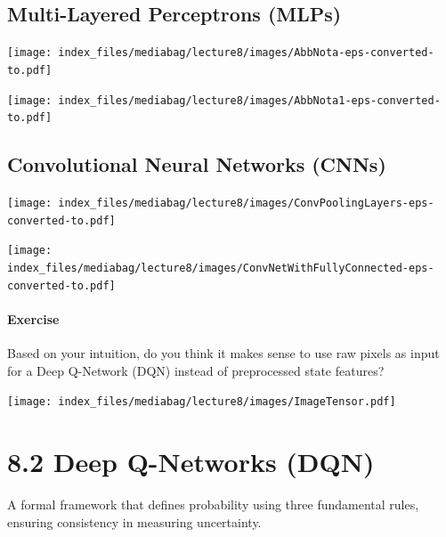 \documentclass[
  letterpaper,
  DIV=11,
  numbers=noendperiod]{scrreprt}
\begin{document}
\section{Multi-Layered Perceptrons
(MLPs)}\label{multi-layered-perceptrons-mlps}

\texttt{[image: index\_files/mediabag/lecture8/images/AbbNota-eps-converted-to.pdf]}

\texttt{[image: index\_files/mediabag/lecture8/images/AbbNota1-eps-converted-to.pdf]}

\section{Convolutional Neural Networks
(CNNs)}\label{convolutional-neural-networks-cnns}

\texttt{[image: index\_files/mediabag/lecture8/images/ConvPoolingLayers-eps-converted-to.pdf]}

\texttt{[image: index\_files/mediabag/lecture8/images/ConvNetWithFullyConnected-eps-converted-to.pdf]}

\subsubsection{\texorpdfstring{ Exercise
}{ Exercise }}\label{exercise-13}

Based on your intuition, do you think it makes sense to use raw pixels
as input for a Deep Q-Network (DQN) instead of preprocessed state
features?

\texttt{[image: index\_files/mediabag/lecture8/images/ImageTensor.pdf]}

\begin{tcolorbox}[enhanced jigsaw, toprule=.15mm, leftrule=.75mm, coltitle=black, left=2mm, opacityback=0, titlerule=0mm, arc=.35mm, toptitle=1mm, opacitybacktitle=0.6, bottomtitle=1mm, colframe=quarto-callout-tip-color-frame, title=\textcolor{quarto-callout-tip-color}{\faLightbulb}\hspace{0.5em}{Solution}, rightrule=.15mm, bottomrule=.15mm, colbacktitle=quarto-callout-tip-color!10!white, breakable, colback=white]

\end{tcolorbox}

\chapter{8.2 Deep Q-Networks (DQN)}\label{deep-q-networks-dqn}

\begin{tcolorbox}[enhanced jigsaw, arc=.35mm, toprule=.15mm, leftrule=.75mm, colback=white, left=2mm, colframe=quarto-callout-note-color-frame, rightrule=.15mm, opacityback=0, breakable, bottomrule=.15mm]

A formal framework that defines probability using three fundamental
rules, ensuring consistency in measuring uncertainty. 🎲

\end{tcolorbox}
\end{document}
